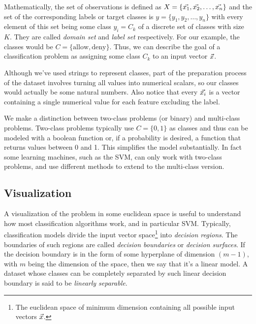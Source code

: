 Mathematically, the set of observations is defined as $X = \{\vec{x_1}, \vec{x_2}, \dots, \vec{x_n}\}$ and the set of the corresponding labels or target classes is $y = \{y_1, y_2, \dots, y_n\}$ with every element of this set being some class $y_i = C_k$ of a discrete set of classes with size $K$. They are called \emph{domain set} and \emph{label set} respectively. For our example, the classes would be $C = \{\text{allow}, \text{deny}\}$. Thus, we can describe the goal of a classification problem as assigning some class $C_k$ to an input vector $\vec{x}$.

Although we've used strings to represent classes, part of the preparation process of the dataset involves turning all values into numerical scalars, so our classes would actually be some natural numbers. Also notice that every $\vec{x_i}$ is a vector containing a single numerical value for each feature excluding the label. 

We make a distinction between two-class problems (or binary) and multi-class problems. Two-class problems typically use $C = \{0, 1\}$ as classes and thus can be modeled with a boolean function or, if a probability is desired, a function that returns values between 0 and 1. This simplifies the model substantially. In fact some learning machines, such as the SVM, can only work with two-class problems, and use different methods to extend to the multi-class version.

\subsection{Visualization}
\label{sec:ch4.visualization}

A visualization of the problem in some euclidean space is useful to understand how most classification algorithms work, and in particular SVM. Typically, clas\-si\-fi\-cation models divide the input vector space\footnote{The euclidean space of minimum dimension containing all possible input vectors $\vec{x}$.} into \emph{decision regions}. The boundaries of such regions are called \emph{decision boundaries} or \emph{decision surfaces}. If the decision boundary is in the form of some hyperplane of dimension $(m - 1)$, with $m$ being the dimension of the space, then we say that it's a linear model. A dataset whose classes can be completely separated by such linear decision boundary is said to be \emph{linearly separable}.

